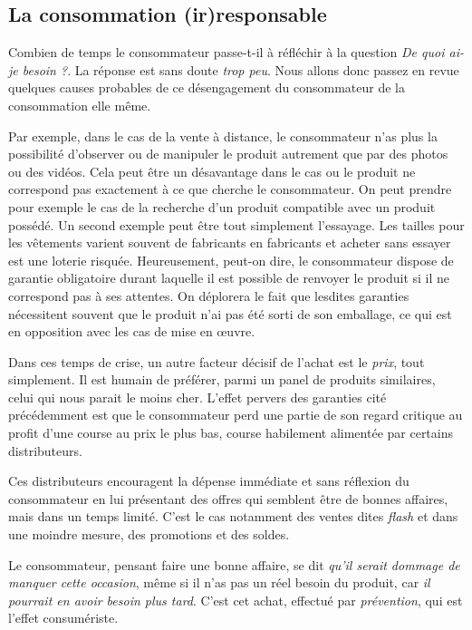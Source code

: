 \subsection{La consommation (ir)responsable}

Combien de temps le consommateur passe-t-il à réfléchir à la question \textit{De quoi ai-je besoin ?}.
La réponse est sans doute \textit{trop peu}. Nous allons donc passez en revue quelques causes probables de ce désengagement du consommateur de la consommation elle même.

\medbreak
Par exemple, dans le cas de la vente à distance, le consommateur n'as plus la possibilité d'observer ou de manipuler le produit autrement que par des photos ou des vidéos.
Cela peut être un désavantage dans le cas ou le produit ne correspond pas exactement à ce que cherche le consommateur.
\medbreak
On peut prendre pour exemple le cas de la recherche d'un produit compatible avec un produit possédé.
Un second exemple peut être tout simplement l'essayage. Les tailles pour les vêtements varient souvent de fabricants en fabricants et acheter sans essayer est une loterie risquée.
\smallbreak
Heureusement, peut-on dire, le consommateur dispose de garantie obligatoire durant laquelle il est possible de renvoyer le produit si il ne correspond pas à ses attentes. On déplorera le fait que lesdites garanties nécessitent souvent que le produit n'ai pas été sorti de son emballage, ce qui est en opposition avec les cas de mise en œuvre.

\medbreak
Dans ces temps de crise, un autre facteur décisif de l'achat est le \textit{prix}, tout simplement.
Il est humain de préférer, parmi un panel de produits similaires, celui qui nous parait le moins cher.
L'effet pervers des garanties cité précédemment est que le consommateur perd une partie de son regard critique au profit d'une course au prix le plus bas, course habilement alimentée par certains distributeurs.

\smallbreak
Ces distributeurs encouragent la dépense immédiate et sans réflexion du consommateur en lui présentant des offres qui semblent être de bonnes affaires, mais dans un temps limité. C'est le cas notamment des ventes dites \textit{flash} et dans une moindre mesure, des promotions et des soldes.

\smallbreak
Le consommateur, pensant faire une bonne affaire, se dit \textit{qu'il serait dommage de manquer cette occasion}, même si il n'as pas un réel besoin du produit, car \textit{il pourrait en avoir besoin plus tard}. C'est cet achat, effectué par \textit{prévention}, qui est l'effet consumériste.

